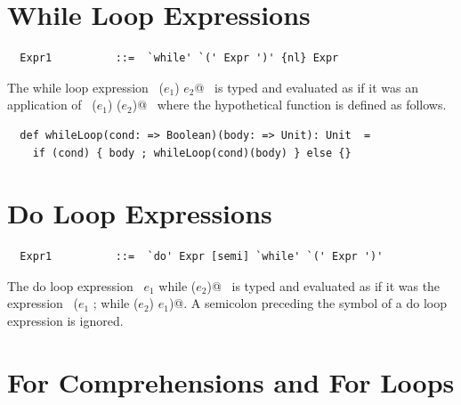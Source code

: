 \section{While Loop Expressions}\label{sec:while}

\syntax\begin{lstlisting}
  Expr1          ::=  `while' `(' Expr ')' {nl} Expr
\end{lstlisting}

The while loop expression ~\lstinline@while ($e_1$) $e_2$@~ is typed and
evaluated as if it was an application of ~\lstinline@whileLoop ($e_1$) ($e_2$)@~ where
the hypothetical function  is defined as follows.

\begin{lstlisting}
  def whileLoop(cond: => Boolean)(body: => Unit): Unit  =
    if (cond) { body ; whileLoop(cond)(body) } else {}
\end{lstlisting}


\section{Do Loop Expressions}

\syntax\begin{lstlisting}
  Expr1          ::=  `do' Expr [semi] `while' `(' Expr ')'
\end{lstlisting}

The do loop expression ~\lstinline@do $e_1$ while ($e_2$)@~ is typed and
evaluated as if it was the expression ~\lstinline@($e_1$ ; while ($e_2$) $e_1$)@.
A semicolon preceding the  symbol of a do loop expression is ignored.

\section{For Comprehensions and For Loops}\label{sec:for-comprehensions}

